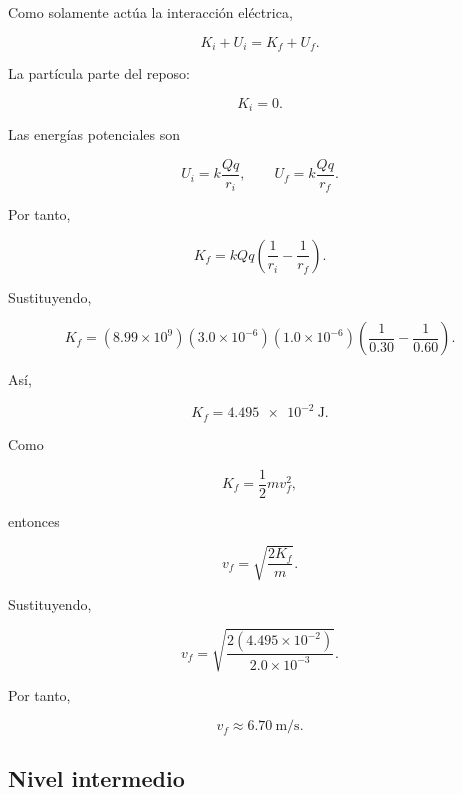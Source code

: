 \begin{explicacion}

Como solamente actúa la interacción eléctrica,

\[
K_i+U_i=K_f+U_f.
\]

La partícula parte del reposo:

\[
K_i=0.
\]

Las energías potenciales son

\[
U_i=k\frac{Qq}{r_i},
\qquad
U_f=k\frac{Qq}{r_f}.
\]

Por tanto,

\[
K_f
=
kQq
\left(
\frac{1}{r_i}-\frac{1}{r_f}
\right).
\]

Sustituyendo,

\[
K_f
=
(8.99\times10^9)
(3.0\times10^{-6})(1.0\times10^{-6})
\left(
\frac{1}{0.30}-\frac{1}{0.60}
\right).
\]

Así,

\[
K_f=\SI{4.495e-2}{\joule}.
\]

Como

\[
K_f=\frac12mv_f^2,
\]

entonces

\[
v_f
=
\sqrt{\frac{2K_f}{m}}.
\]

Sustituyendo,

\[
v_f
=
\sqrt{
\frac{2(4.495\times10^{-2})}{2.0\times10^{-3}}
}.
\]

Por tanto,

\[
\boxed{v_f\approx\SI{6.70}{\metre\per\second}}.
\]

\end{explicacion}


\subsection{Nivel intermedio}

